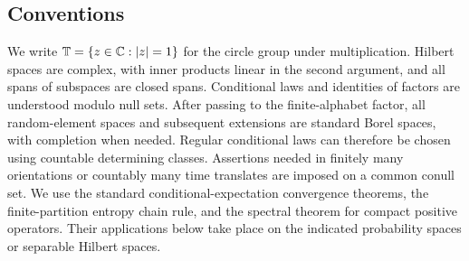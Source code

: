 \subsection*{Conventions}

We write $\mathbb T=\{z\in\mathbb C:\lvert z\rvert=1\}$ for the circle group under
multiplication. Hilbert spaces are complex, with inner products linear in
the second argument, and all spans of subspaces are closed spans. Conditional laws
and identities of factors are understood modulo null sets. After passing
to the finite-alphabet factor, all random-element spaces and subsequent
extensions are standard Borel spaces, with completion when needed.
Regular conditional laws can therefore be chosen using countable
determining classes. Assertions needed in finitely many orientations or
countably many time translates are imposed on a common conull set.
We use the standard conditional-expectation convergence theorems, the
finite-partition entropy chain rule, and the spectral theorem for compact
positive operators. Their applications below take place on the indicated
probability spaces or separable Hilbert spaces.
